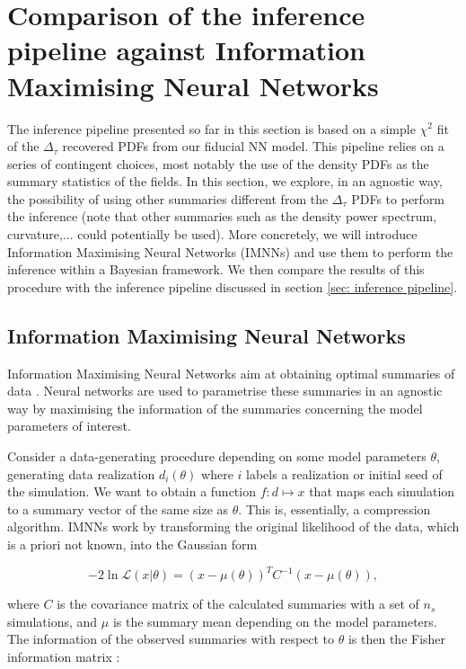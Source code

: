 \section{Comparison of the inference pipeline against Information Maximising Neural Networks}


The inference pipeline presented so far in this section is based on a simple $\chi^2$ fit of the $\Delta_\tau$ recovered PDFs from our fiducial NN model. This pipeline relies on a series of contingent choices, most notably the use of the density PDFs as the summary statistics of the fields. In this section, we explore, in an agnostic way, the possibility of using other summaries different from the $\Delta_\tau$ PDFs to perform the inference (note that other summaries such as the density power spectrum, curvature,... could potentially be used). More concretely, we will introduce Information Maximising Neural Networks (IMNNs) and use them to perform the inference within a Bayesian framework. We then compare the results of this procedure with the inference pipeline discussed in section \ref{sec: inference pipeline}.

\subsection{Information Maximising Neural Networks}
Information Maximising Neural Networks aim at obtaining optimal summaries of data \cite{Charnock_2018}. Neural networks are used to parametrise these summaries in an agnostic way by maximising the information of the summaries concerning the model parameters of interest.

Consider a data-generating procedure depending on some model parameters $\theta$, generating data realization $d_i(\theta)$ where $i$ labels a realization or initial seed of the simulation. We want to obtain a function $f \colon d \mapsto x$ that maps each simulation to a summary vector of the same size as $\theta$. This is, essentially, a compression algorithm. IMNNs work by transforming the original likelihood of the data, which is a priori not known, into the Gaussian form

\begin{equation}
    -2\ln\mathcal{L}\left(x|\theta\right)=\left(x-\mu\left(\theta\right)\right)^TC^{-1}\left(x-\mu\left(\theta\right)\right),
\end{equation}

where $C$ is the covariance matrix of the calculated summaries with a set of $n_s$ simulations, and $\mu$ is the summary mean depending on the model parameters. The information of the observed summaries with respect to $\theta$ is then the Fisher information matrix \cite{ly2017tutorialfisherinformation}:

